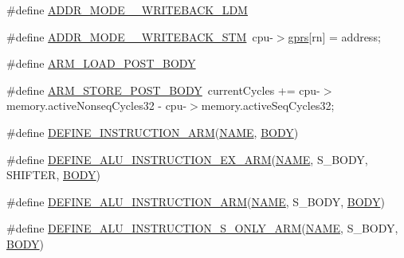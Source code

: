 \begin{DoxyCompactItemize}
\item 
\#define \mbox{\hyperlink{isa-arm_8c_af06ac7c3148d0794db422de145441358}{A\+D\+D\+R\+\_\+\+M\+O\+D\+E\+\_\+\_\+\+W\+R\+I\+T\+E\+B\+A\+C\+K\+\_\+\+L\+DM}}
\item 
\#define \mbox{\hyperlink{isa-arm_8c_a38ecd70c428ac8ce3585238874c3b885}{A\+D\+D\+R\+\_\+\+M\+O\+D\+E\+\_\+\_\+\+W\+R\+I\+T\+E\+B\+A\+C\+K\+\_\+\+S\+TM}}~cpu-\/$>$\mbox{\hyperlink{isa-thumb_8c_a6b4b7e13a9a144391615b217c5917bc7}{gprs}}\mbox{[}rn\mbox{]} = address;
\item 
\#define \mbox{\hyperlink{isa-arm_8c_a60cc80890b8064edb6cbc3b46949bc53}{A\+R\+M\+\_\+\+L\+O\+A\+D\+\_\+\+P\+O\+S\+T\+\_\+\+B\+O\+DY}}
\item 
\#define \mbox{\hyperlink{isa-arm_8c_a89c8c7f3e719a849575d2fff43d9d4c1}{A\+R\+M\+\_\+\+S\+T\+O\+R\+E\+\_\+\+P\+O\+S\+T\+\_\+\+B\+O\+DY}}~current\+Cycles += cpu-\/$>$memory.\+active\+Nonseq\+Cycles32 -\/ cpu-\/$>$memory.\+active\+Seq\+Cycles32;
\item 
\#define \mbox{\hyperlink{isa-arm_8c_a56ae89d1d9edfe3d78f30c0a60273883}{D\+E\+F\+I\+N\+E\+\_\+\+I\+N\+S\+T\+R\+U\+C\+T\+I\+O\+N\+\_\+\+A\+RM}}(\mbox{\hyperlink{inflate_8h_a164ea0159d5f0b5f12a646f25f99eceaa67bc2ced260a8e43805d2480a785d312}{N\+A\+ME}},  \mbox{\hyperlink{gzlog_8c_aa6bdf6a6d9916c343e1e17774d84a156}{B\+O\+DY}})
\item 
\#define \mbox{\hyperlink{isa-arm_8c_af5a7c9d844c906c7f00a6aa651397587}{D\+E\+F\+I\+N\+E\+\_\+\+A\+L\+U\+\_\+\+I\+N\+S\+T\+R\+U\+C\+T\+I\+O\+N\+\_\+\+E\+X\+\_\+\+A\+RM}}(\mbox{\hyperlink{inflate_8h_a164ea0159d5f0b5f12a646f25f99eceaa67bc2ced260a8e43805d2480a785d312}{N\+A\+ME}},  S\+\_\+\+B\+O\+DY,  S\+H\+I\+F\+T\+ER,  \mbox{\hyperlink{gzlog_8c_aa6bdf6a6d9916c343e1e17774d84a156}{B\+O\+DY}})
\item 
\#define \mbox{\hyperlink{isa-arm_8c_a10171ea841e3ba7eb45b27023d684608}{D\+E\+F\+I\+N\+E\+\_\+\+A\+L\+U\+\_\+\+I\+N\+S\+T\+R\+U\+C\+T\+I\+O\+N\+\_\+\+A\+RM}}(\mbox{\hyperlink{inflate_8h_a164ea0159d5f0b5f12a646f25f99eceaa67bc2ced260a8e43805d2480a785d312}{N\+A\+ME}},  S\+\_\+\+B\+O\+DY,  \mbox{\hyperlink{gzlog_8c_aa6bdf6a6d9916c343e1e17774d84a156}{B\+O\+DY}})
\item 
\#define \mbox{\hyperlink{isa-arm_8c_ab758709bf7316fb44770422bb4da8956}{D\+E\+F\+I\+N\+E\+\_\+\+A\+L\+U\+\_\+\+I\+N\+S\+T\+R\+U\+C\+T\+I\+O\+N\+\_\+\+S\+\_\+\+O\+N\+L\+Y\+\_\+\+A\+RM}}(\mbox{\hyperlink{inflate_8h_a164ea0159d5f0b5f12a646f25f99eceaa67bc2ced260a8e43805d2480a785d312}{N\+A\+ME}},  S\+\_\+\+B\+O\+DY,  \mbox{\hyperlink{gzlog_8c_aa6bdf6a6d9916c343e1e17774d84a156}{B\+O\+DY}})

\end{DoxyCompactItemize}
